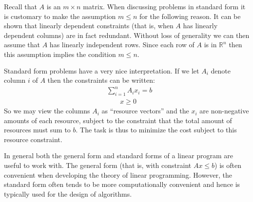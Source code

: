 \documentclass[12pt]{article}
\newcommand{\R}{\mathcal{R}}
\def\R{\mathbb{R}}
\begin{document}
Recall that $A$ is an $m \times n$ matrix. When discussing problems in standard form it is customary to make the assumption $m \leq n$ for the following reason. It can be shown that 
linearly dependent constraints (that is, when $A$ has linearly dependent columns) are in fact redundant. Without loss of generality we can then assume that $A$ has linearly independent 
rows. Since each row of $A$ is in $\R^n$ then this assumption implies the condition $m \leq n$.  

Standard form problems have a very nice interpretation. If we let $A_i$ denote column $i$ of $A$ then the constraints can be written: 
\begin{align*}
&\sum_{i = 1}^{n} A_i x_i = b\\
&\;\;\;\;\;\;\; x \geq 0
\end{align*}
So we may view the columns $A_i$ as ``resource vectors'' and the $x_i$ are non-negative amounts of each resource, subject to the constraint that the total amount of resources must
sum to $b$. The task is thus to minimize the cost subject to this resource constraint. 

In general both the general form and standard forms of a linear program are useful
to work with. The general form (that is, with constraint $Ax \leq b$) is often convenient when developing the theory of linear programming. However, the standard form often tends to be 
more computationally convenient and hence is typically used for the design of algorithms. 
	
\end{document}

